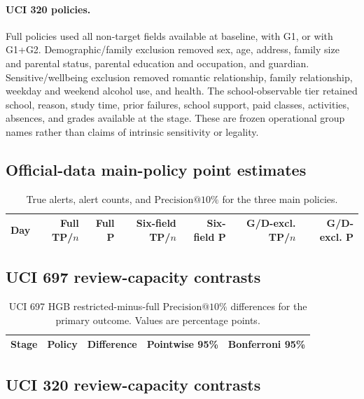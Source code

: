 \documentclass[education,supfile,submit,moreauthors]{Definitions/mdpi}
\makeatletter
\newcommand{\Pten}{\ensuremath{\mathrm{Precision}@10\%}}
\makeatother
\begin{document}
\paragraph{UCI 320 policies.}
Full policies used all non-target fields available at baseline, with G1, or with G1+G2. Demographic/family exclusion removed sex, age, address, family size and parental status, parental education and occupation, and guardian. Sensitive/wellbeing exclusion removed romantic relationship, family relationship, weekday and weekend alcohol use, and health. The school-observable tier retained school, reason, study time, prior failures, school support, paid classes, activities, absences, and grades available at the stage. These are frozen operational group names rather than claims of intrinsic sensitivity or legality.

\subsection{Official-data main-policy point estimates}

\begin{table}[H]
\centering
\caption{True alerts, alert counts, and \Pten{} for the three main policies.}
\label{tab:s_main_points}
\small
\setlength{\tabcolsep}{3.3pt}
\begin{tabular}{rrrrrrr}
\toprule
Day & Full TP/$n$ & Full P & Six-field TP/$n$ & Six-field P & G/D-excl. TP/$n$ & G/D-excl. P \\
\midrule

\end{tabular}
\end{table}
\FloatBarrier

\subsection{UCI 697 review-capacity contrasts}

\begin{table}[H]
\centering
\caption{UCI 697 HGB restricted-minus-full \Pten{} differences for the primary outcome. Values are percentage points.}
\label{tab:s_uci697}
\footnotesize
\begin{tabular}{llrrr}
\toprule
Stage & Policy & Difference & Pointwise 95\% & Bonferroni 95\% \\
\midrule

\end{tabular}
\end{table}
\FloatBarrier

\subsection{UCI 320 review-capacity contrasts}
\end{document}
